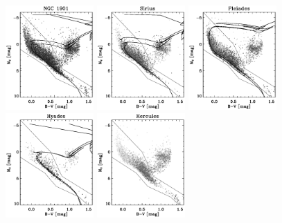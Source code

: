 \clearpage
\begin{figure}
\begin{center}
\includegraphics[width=0.3\textwidth]{figs_groups/cmd_ngc1901.ps}
\includegraphics[width=0.3\textwidth]{figs_groups/cmd_sirius.ps}
\includegraphics[width=0.3\textwidth]{figs_groups/cmd_pleiades.ps}\\
\includegraphics[width=0.3\textwidth]{figs_groups/cmd_hyades.ps}
\includegraphics[width=0.3\textwidth]{figs_groups/cmd_hercules.ps}

\end{center}
\end{figure}
